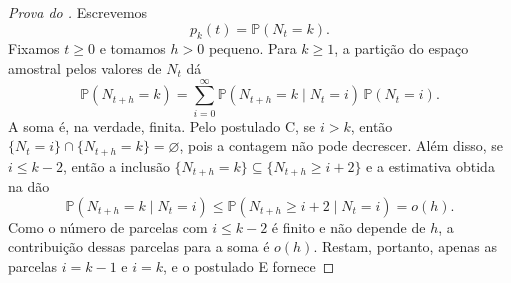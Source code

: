 \documentclass[12pt,portuguese]{article}
\theoremstyle{definition}
\theoremstyle{plainexercise}
\theoremstyle{starredexercise}
\theoremstyle{definition}
\begin{document}
\begin{proof}[Prova do ]
Escrevemos
\[
  p_k(t)=\mathbb{P}(N_t=k).
\]
Fixamos $t\geqslant0$ e tomamos $h>0$ pequeno. Para $k\geqslant1$, a
partição do espaço amostral pelos valores de $N_t$ dá
\[
  \mathbb{P}(N_{t+h}=k)
  =\sum_{i=0}^{\infty}\mathbb{P}(N_{t+h}=k\mid N_t=i)\,\mathbb{P}(N_t=i).
\]
A soma é, na verdade, finita. Pelo postulado C, se $i>k$, então
$\{N_t=i\}\cap\{N_{t+h}=k\}=\varnothing$, pois a contagem não pode decrescer.
Além disso, se $i\leqslant k-2$, então a inclusão
$\{N_{t+h}=k\}\subseteq\{N_{t+h}\geqslant i+2\}$ e a estimativa obtida na
 dão
\[
  \mathbb{P}(N_{t+h}=k\mid N_t=i)
  \leqslant\mathbb{P}(N_{t+h}\geqslant i+2\mid N_t=i)=o(h).
\]
Como o número de parcelas com $i\leqslant k-2$ é finito e não depende de $h$,
a contribuição dessas parcelas para a soma é $o(h)$. Restam, portanto, apenas
as parcelas $i=k-1$ e $i=k$, e o postulado E fornece


\end{proof}
\end{document}
